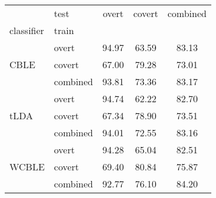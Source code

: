 \begin{tabular}{@{}llccc@{}}
\toprule
 & test & overt & covert & combined \\
classifier & train &  &  &  \\
\midrule
\multirow[t]{3}{*}{CBLE} & overt & 94.97 & 63.59 & 83.13 \\
 & covert & 67.00 & 79.28 & 73.01 \\
 & combined & 93.81 & 73.36 & 83.17 \\
\midrule
\multirow[t]{3}{*}{tLDA} & overt & 94.74 & 62.22 & 82.70 \\
 & covert & 67.34 & 78.90 & 73.51 \\
 & combined & 94.01 & 72.55 & 83.16 \\
 \midrule
\multirow[t]{3}{*}{WCBLE} & overt & 94.28 & 65.04 & 82.51 \\
 & covert & 69.40 & 80.84 & 75.87 \\
 & combined & 92.77 & 76.10 & 84.20 \\
\bottomrule
\end{tabular}
